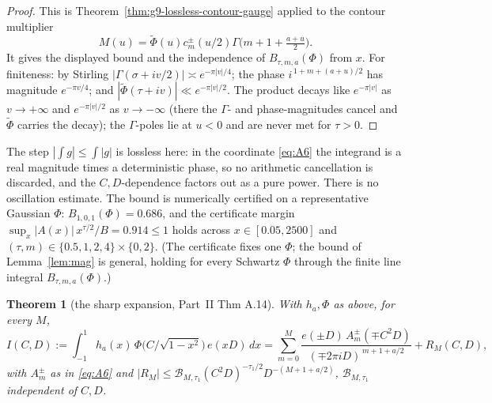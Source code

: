 \documentclass[11pt]{article}
\newtheorem{theorem}{Theorem}
\theoremstyle{definition}
\newcommand{\wt}[1]{\widetilde{#1}}
\begin{document}
\begin{proof}
This is Theorem~\ref{thm:g9-lossless-contour-gauge} applied to the contour
multiplier
\[
M(u)=\wt\Phi(u)c^\pm_m(u/2)
\Gamma\!\big(m{+}1{+}\tfrac{a+u}{2}\big).
\]
It gives the displayed bound and the independence of \(B_{\tau,m,a}(\Phi)\)
from \(x\).  For finiteness: by Stirling $|\Gamma(\sigma+iv/2)|\asymp e^{-\pi|v|/4}$; the phase
$i^{\,1+m+(a+u)/2}$ has magnitude $e^{-\pi v/4}$; and $|\wt\Phi(\tau+iv)|\ll e^{-\pi|v|/2}$. The
product decays like $e^{-\pi|v|}$ as $v\to+\infty$ and $e^{-\pi|v|/2}$ as $v\to-\infty$ (there the
$\Gamma$- and phase-magnitudes cancel and $\wt\Phi$ carries the decay); the $\Gamma$-poles lie at
$u<0$ and are never met for $\tau>0$.
\end{proof}

The step $|\int g|\le\int|g|$ is lossless here: in the coordinate \eqref{eq:A6} the integrand is a
real magnitude times a deterministic phase, so no arithmetic cancellation is discarded, and the
$C,D$-dependence factors out as a pure power. There is no oscillation estimate. The bound is
numerically certified on a representative Gaussian $\Phi$: $B_{1,0,1}(\Phi)=0.686$, and the certificate
margin $\sup_x |A(x)|\,x^{\tau/2}/B=0.914\le1$ holds across $x\in[0.05,2500]$ and
$(\tau,m)\in\{0.5,1,2,4\}\times\{0,2\}$. (The certificate fixes one $\Phi$; the bound of
Lemma~\ref{lem:mag} is general, holding for every Schwartz $\Phi$ through the finite line integral
$B_{\tau,m,a}(\Phi)$.)

\begin{theorem}[the sharp expansion, Part~II Thm A.14]\label{thm:A14}
With $h_a,\Phi$ as above, for every $M$,
\[
  I(C,D):=\int_{-1}^{1}h_a(x)\,\Phi\!\big(C/\sqrt{1-x^2}\big)\,e(xD)\,dx
  =\sum_{m=0}^{M}\frac{e(\pm D)\,A^{\pm}_m(\mp C^2D)}{(\mp 2\pi iD)^{\,m+1+a/2}}+R_M(C,D),
\]
with $A^\pm_m$ as in \eqref{eq:A6} and $|R_M|\le\mathcal B_{M,\tau_1}(C^2D)^{-\tau_1/2}
D^{-(M+1+a/2)}$, $\mathcal B_{M,\tau_1}$ independent of $C,D$.
\end{theorem}
\end{document}
